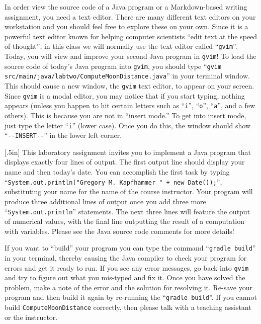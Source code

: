 \documentclass[11pt]{article}
\newcommand{\mainprogram}{\lstinline{ComputeMoonDistance}}
\newcommand{\gradlebuild}{\command{gradle build}}
\newcommand{\command}[1]{``\lstinline{#1}''}
\newcommand{\program}[1]{\lstinline{#1}}
\newcommand{\option}[1]{``{#1}''}
\newcommand{\step}[1]{``{#1}''}
\newcommand{\think}[1]{\null\hfill\LARGE{\faCogs{}}\newline\scriptsize{\em{#1}}}
\begin{document}
In order view the source code of a Java program or a Markdown-based writing
assignment, you need a text editor. There are many different text editors on
your workstation and you should feel free to explore these on your own. Since it
is a powerful text editor known for helping computer scientists ``edit text at
the speed of thought'', in this class we will normally use the text editor
called \command{gvim}. Today, you will view and improve your second Java program
in {\tt gvim}! To load the source code of today's Java program into
\program{gvim}, you should type \command{gvim
src/main/java/labtwo/ComputeMoonDistance.java} in your terminal window. This
should cause a new window, the \program{gvim} text editor, to appear on your
screen. Since \program{gvim} is a modal editor, you may notice that if you start
typing, nothing appears (unless you happen to hit certain letters such as
\command{i}, \command{o}, \command{a}, and a few others). This is because you
are not in ``insert mode.'' To get into insert mode, just type the letter
\command{i} (lower case). Once you do this, the window should show
\command{--INSERT--} in the lower left corner.

\marginnote{\think{Use program variables}}[.5in] This laboratory assignment
invites you to implement a Java program that displays exactly four lines of
output. The first output line should display your name and then today's date.
You can accomplish the first task by typing \command{System.out.println("Gregory
M. Kapfhammer " + new Date());}, substituting your name for the name of the
course instructor. Your program will produce three additional lines of output
once you add three more \command{System.out.println} statements. The next three
lines will feature the output of numerical values, with the final line
outputting the result of a computation with variables. Please see the Java
source code comments for more details!


If you want to \step{build} your program you can type the command \gradlebuild{}
in your terminal, thereby causing the Java compiler to check your program for
errors and get it ready to run. If you see any error messages, go back into
\program{gvim} and try to figure out what you mis-typed and fix it. Once you
have solved the problem, make a note of the error and the solution for resolving
it. Re-save your program and then build it again by re-running the
\gradlebuild{}. If you cannot build \mainprogram{} correctly, then please talk
with a teaching assistant or the instructor.
\end{document}
